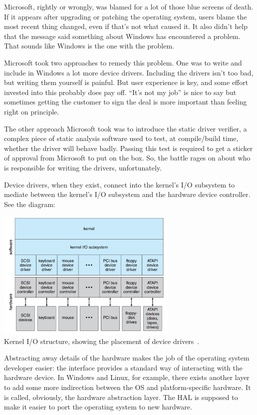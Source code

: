 Microsoft, rightly or wrongly, was blamed for a lot of those blue screens of death. If it appears after upgrading or patching the operating system, users blame the most recent thing changed, even if that's not what caused it. It also didn't help that the message said something about Windows has encountered a problem. That sounds like Windows is the one with the problem. 

Microsoft took two approaches to remedy this problem. One was to write and include in Windows a lot more device drivers. Including the drivers isn't too bad, but writing them yourself is painful. But user experience is key, and some effort invested into this probably does pay off. ``It's not my job'' is nice to say but sometimes getting the customer to sign the deal is more important than feeling right on principle.

The other approach Microsoft took was to introduce the static driver verifier, a complex piece of static analysis software used to test, at compile/build time, whether the driver will behave badly. Passing this test is required to get a sticker of approval from Microsoft to put on the box. So, the battle rages on about who is responsible for writing the drivers, unfortunately.

Device drivers, when they exist, connect into the kernel's I/O subsystem to mediate between the kernel's I/O subsystem and the hardware device controller. See the diagram:

\begin{center}
	\includegraphics[width=0.65\textwidth]{images/kernel-io-structure.png}\\
	Kernel I/O structure, showing the placement of device drivers~\cite{osc}.
\end{center}

Abstracting away details of the hardware makes the job of the operating system developer easier: the interface provides a standard way of interacting with the hardware device. In Windows and Linux, for example, there exists another layer to add some more indirection between the OS and platform-specific hardware. It is called, obviously, the hardware abstraction layer. The HAL is supposed to make it easier to port the operating system to new hardware.


